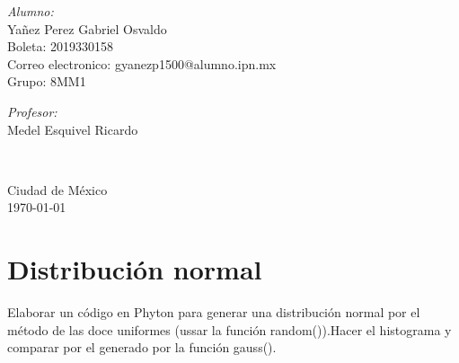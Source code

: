 \documentclass[10pt]{article}\usepackage[]{graphicx}\usepackage[]{color}
\begin{document}
\begin{center}
\begin{minipage}{0.46\textwidth}
\begin{flushleft}
\emph{Alumno:}\\	
Yañez Perez Gabriel Osvaldo\\
Boleta: 2019330158\\
Correo electronico: gyanezp1500@alumno.ipn.mx\\
Grupo: 8MM1
\end{flushleft}																		%
\end{minipage}		
\begin{minipage}{0.52\textwidth}		
\vspace{-0.6cm}											%
\begin{flushright} \large															%
\emph{Profesor:} \\																	%
Medel Esquivel Ricardo\\
\end{flushright}																	%
\end{minipage}	
\vspace*{1cm}
 	
 		\\																		%
\vspace{2cm} 																				
\begin{center}	
Ciudad de México  \\
{\large \today}																	%
 			\end{center}												  						
\end{center}							 											
																					
\newpage																			

\tableofcontents 
\newpage

\section{Distribución normal}
Elaborar un código en Phyton para generar una distribución normal por el método de las doce uniformes (ussar la función random()).Hacer el histograma y comparar por el generado por la función gauss().
\end{document}
